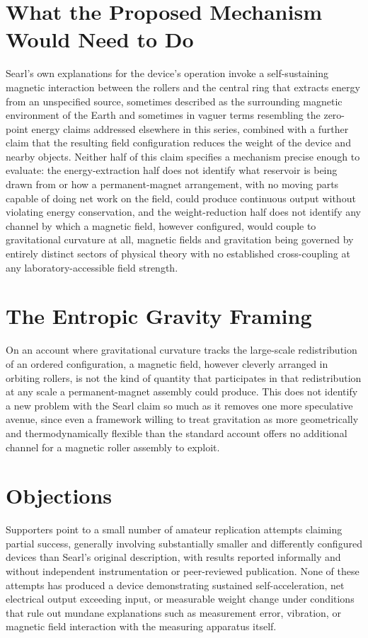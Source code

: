 \documentclass[11pt]{article}
\begin{document}
\section{What the Proposed Mechanism Would Need to Do}

Searl's own explanations for the device's operation invoke a self-sustaining magnetic interaction between the rollers and the central ring that extracts energy from an unspecified source, sometimes described as the surrounding magnetic environment of the Earth and sometimes in vaguer terms resembling the zero-point energy claims addressed elsewhere in this series, combined with a further claim that the resulting field configuration reduces the weight of the device and nearby objects. Neither half of this claim specifies a mechanism precise enough to evaluate: the energy-extraction half does not identify what reservoir is being drawn from or how a permanent-magnet arrangement, with no moving parts capable of doing net work on the field, could produce continuous output without violating energy conservation, and the weight-reduction half does not identify any channel by which a magnetic field, however configured, would couple to gravitational curvature at all, magnetic fields and gravitation being governed by entirely distinct sectors of physical theory with no established cross-coupling at any laboratory-accessible field strength.

\section{The Entropic Gravity Framing}

On an account where gravitational curvature tracks the large-scale redistribution of an ordered configuration, a magnetic field, however cleverly arranged in orbiting rollers, is not the kind of quantity that participates in that redistribution at any scale a permanent-magnet assembly could produce. This does not identify a new problem with the Searl claim so much as it removes one more speculative avenue, since even a framework willing to treat gravitation as more geometrically and thermodynamically flexible than the standard account offers no additional channel for a magnetic roller assembly to exploit.

\section{Objections}

Supporters point to a small number of amateur replication attempts claiming partial success, generally involving substantially smaller and differently configured devices than Searl's original description, with results reported informally and without independent instrumentation or peer-reviewed publication. None of these attempts has produced a device demonstrating sustained self-acceleration, net electrical output exceeding input, or measurable weight change under conditions that rule out mundane explanations such as measurement error, vibration, or magnetic field interaction with the measuring apparatus itself.
\end{document}
